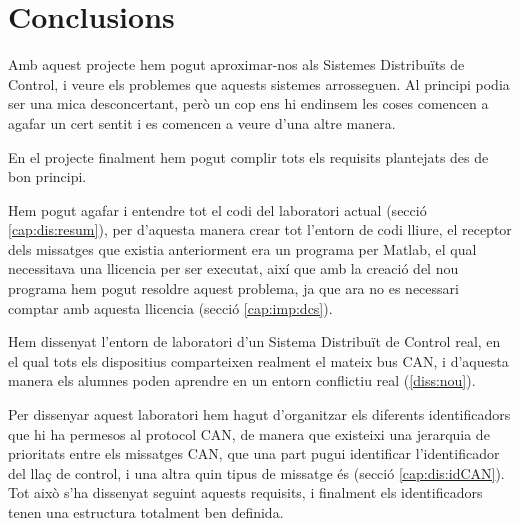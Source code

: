 

\chapter{Conclusions}\label{cap:conc} %



\ifpdf
    \graphicspath{{8_conclusions/figures/PNG/}{8_conclusions/figures/PDF/}{8_conclusions/figures/}}
\else
    \graphicspath{{8_conclusions/figures/EPS/}{8_conclusions/figures/}}
\fi


Amb aquest projecte hem pogut aproximar-nos als Sistemes Distribuïts de Control, i veure els problemes que aquests sistemes arrosseguen. Al principi podia ser una mica desconcertant, però un cop ens hi endinsem les coses comencen a agafar un cert sentit i es comencen a veure d'una altre manera.

En el projecte finalment hem pogut complir tots els requisits plantejats des de bon principi.

Hem pogut agafar i entendre tot el codi del laboratori actual (secció \ref{cap:dis:resum}), per d'aquesta manera crear tot l'entorn de codi lliure, el receptor dels missatges que existia anteriorment era un programa per Matlab, el qual necessitava una llicencia per ser executat, així que amb la creació del nou programa \DCSMonitor hem pogut resoldre aquest problema, ja que ara no es necessari comptar amb aquesta llicencia (secció \ref{cap:imp:dcs}).

Hem dissenyat l'entorn de laboratori d'un Sistema Distribuït de Control real, en el qual tots els dispositius comparteixen realment el mateix bus CAN, i d'aquesta manera els alumnes poden aprendre en un entorn conflictiu real (\ref{diss:nou}). 

Per dissenyar aquest laboratori hem hagut d'organitzar els diferents identificadors que hi ha permesos al protocol CAN, de manera que existeixi una jerarquia de prioritats entre els missatges CAN, que una part pugui identificar l'identificador del llaç de control, i una altra quin tipus de missatge és (secció \ref{cap:dis:idCAN}). Tot això s'ha dissenyat seguint aquests requisits, i finalment els identificadors tenen una estructura totalment ben definida.

